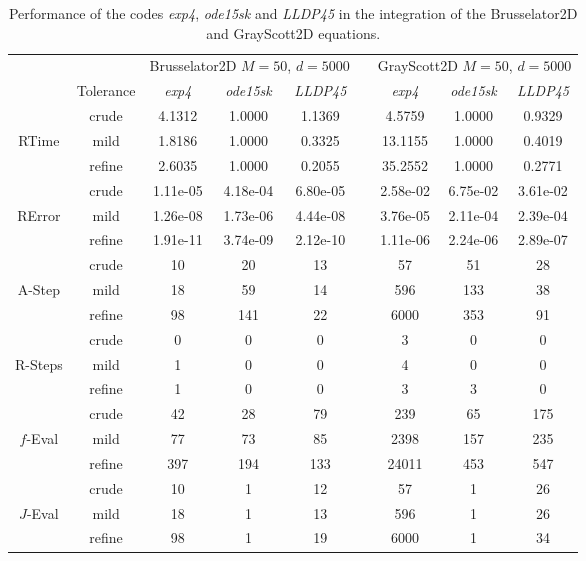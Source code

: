 \begin{table}[h]
	\caption{Performance of the codes \emph{exp4}, \emph{ode15sk} and  \emph{LLDP45} in the integration of the Brusselator2D and GrayScott2D  equations.}	\label{tab:num-exp-lldp-var-step:bruss2dgray2d}
	\begin{adjustbox}{width=0.8\columnwidth,center}
	\begin{tabular}{  ccccccccc }
		\hline
		& & \multicolumn{3}{c}{Brusselator2D $M=50$, $d=5000$ } & & \multicolumn{3}{c}{GrayScott2D $M=50$, $d=5000$ }\\
		\cline{3-5} \cline{7-9}
		& Tolerance & \emph{exp4} & \emph{ode15sk} & \emph{LLDP45} & & \emph{exp4} & \emph{ode15sk} & \emph{LLDP45} \\
		\hline
		& crude & 4.1312 & 1.0000 & 1.1369 &  & 4.5759 & 1.0000 & 0.9329 \\
		RTime  & mild & 1.8186 & 1.0000 & 0.3325 &  & 13.1155 & 1.0000 & 0.4019 \\
		& refine & 2.6035 & 1.0000 & 0.2055  & & 35.2552 & 1.0000 & 0.2771 \\
		\hline
		& crude & 1.11e-05 & 4.18e-04 & 6.80e-05 & &  2.58e-02 & 6.75e-02 & 3.61e-02 \\
		RError  & mild & 1.26e-08 & 1.73e-06 & 4.44e-08 & &  3.76e-05 & 2.11e-04 & 2.39e-04 \\
		& refine & 1.91e-11 & 3.74e-09 & 2.12e-10 & &  1.11e-06 & 2.24e-06 & 2.89e-07 \\
		\hline
		& crude & 10 & 20 & 13 &  & 57 & 51 & 28 \\
		A-Step  & mild & 18 & 59 & 14 & &  596 & 133 & 38 \\
		& refine & 98 & 141 & 22 & &  6000 & 353 & 91 \\
		\hline
		& crude & 0 & 0 & 0  & & 3 & 0 & 0 \\
		R-Steps  & mild & 1 & 0 & 0  & & 4 & 0 & 0 \\
		& refine & 1 & 0 & 0  & & 3 & 3 & 0 \\
		\hline
		& crude & 42 & 28 & 79  & & 239 & 65 & 175 \\
		$f$-Eval  & mild & 77 & 73 & 85  & & 2398 & 157 & 235 \\
		& refine & 397 & 194 & 133  & & 24011 & 453 & 547 \\
		\hline
		& crude & 10 & 1 & 12 & &  57 & 1 & 26 \\
		$J$-Eval  & mild & 18 & 1 & 13  & & 596 & 1 & 26 \\
		& refine & 98 & 1 & 19 & &  6000 & 1 & 34 \\

\end{tabular}
\end{adjustbox}
\end{table}

